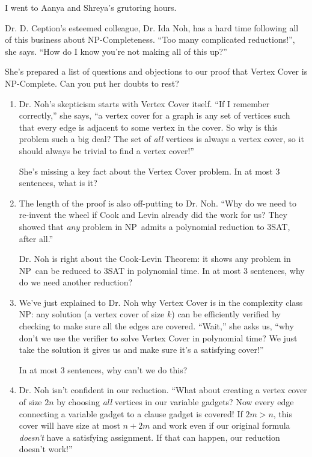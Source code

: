 \documentclass[12 pt, letterpaper]{hmcpset}
\newcommand{\NP}{\textsf{NP}}
\begin{document}
I went to Aanya and Shreya's grutoring hours.

\begin{problem}
Dr. D. Ception's esteemed colleague, Dr. Ida Noh, has a hard time following all of this business about \NP-Completeness. ``Too many complicated reductions!'', she says. ``How do I know you're not making all of this up?''

She's prepared a list of questions and objections to our proof that {\sc Vertex Cover} is \NP-Complete. Can you put her doubts to rest?

\begin{enumerate}
    \item Dr. Noh's skepticism starts with {\sc Vertex Cover} itself. ``If I remember correctly,'' she says, ``a vertex cover for a graph is any set of vertices such that every edge is adjacent to some vertex in the cover. So why is this problem such a big deal? The set of \emph{all} vertices is always a vertex cover, so it should always be trivial to find a vertex cover!''

    She's missing a key fact about the {\sc Vertex Cover} problem. In at most 3 sentences, what is it?

    \item The length of the proof is also off-putting to Dr. Noh. ``Why do we need to re-invent the wheel if Cook and Levin already did the work for us? They showed that \emph{any} problem in \NP~admits a polynomial reduction to {\sc 3SAT}, after all.''

    Dr. Noh is right about the Cook-Levin Theorem: it shows any problem in \NP~can be reduced to  {\sc 3SAT} in polynomial time. In at most 3 sentences, why do we need another reduction?

    \item We've just explained to Dr. Noh why {\sc Vertex Cover} is in the complexity class \NP: any solution (a vertex cover of size $k$) can be efficiently verified by checking to make sure all the edges are covered. ``Wait,'' she asks us, ``why don't we use the verifier to solve {\sc Vertex Cover} in polynomial time? We just take the solution it gives us and make sure it's a satisfying cover!''

    In at most 3 sentences, why can't we do this?

    \item Dr. Noh isn't confident in our reduction. ``What about creating a vertex cover of size $2n$ by choosing \emph{all} vertices in our variable gadgets? Now every edge connecting a variable gadget to a clause gadget is covered! If $2m > n$, this cover will have size at most $n + 2m$ and work even if our original formula \emph{doesn't} have a satisfying assignment. If that can happen, our reduction doesn't work!''


\end{enumerate}
\end{problem}
\end{document}
